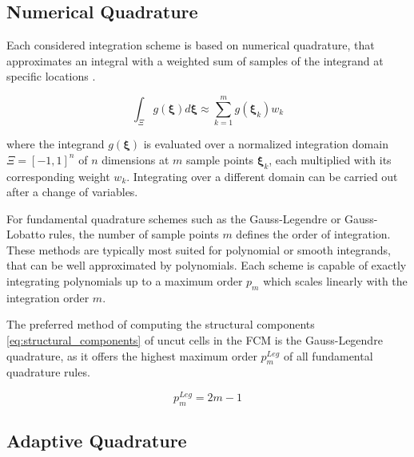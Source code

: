 \subsection*{Numerical Quadrature}
\label{subsection:numerical_quadrature}

Each considered integration scheme is based on numerical quadrature, that approximates an integral with a weighted sum of samples of the integrand at specific locations \cite{Atkinson1988}.

\begin{equation}
	\int_{\Xi} g(\boldsymbol{\xi}) d\boldsymbol{\xi} \approx \sum_{k=1}^m g(\boldsymbol{\xi}_k) w_k
\end{equation}

where the integrand $g(\boldsymbol{\xi})$ is evaluated over a normalized integration domain $\Xi = [-1,1]^n$ of $n$ dimensions at $m$ sample points $\boldsymbol{\xi}_k$, each multiplied with its corresponding weight $w_k$. Integrating over a different domain can be carried out after a change of variables.

For fundamental quadrature schemes such as the Gauss-Legendre or Gauss-Lobatto rules, the number of sample points $m$ defines the order of integration. These methods are typically most suited for polynomial or smooth integrands, that can be well approximated by polynomials. Each scheme is capable of exactly integrating polynomials up to a maximum order $p_m$ which scales linearly with the integration order $m$.

The preferred method of computing the structural components \ref{eq:structural_components} of uncut cells in the FCM is the Gauss-Legendre quadrature, as it offers the highest maximum order $p_m^{Leg}$ of all fundamental quadrature rules.

\begin{equation} \label{eq:gauss_legendre_maximum_order}
	p_m^{Leg} = 2m - 1
\end{equation}

\subsection*{Adaptive Quadrature}
\label{subsection:adaptive_quadrature}

